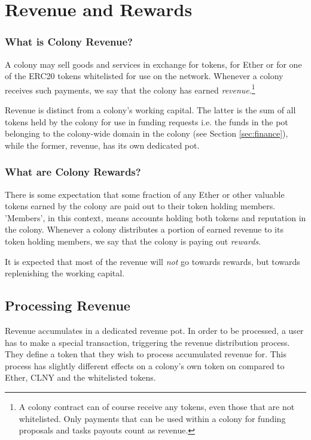 \section{Revenue and Rewards}\label{sec:revenue}

\subsubsection*{What is Colony Revenue?}
A colony may sell goods and services in exchange for tokens, for Ether or for one of the  ERC20 tokens whitelisted for use on the network. Whenever a colony receives such payments, we say that the colony has earned \emph{revenue}.\footnote{A colony contract can of course receive any tokens, even those that are not whitelisted. Only payments that can be used within a colony for funding proposals and tasks payouts count as revenue.}

Revenue is distinct from a colony's working capital. The latter is the sum of all tokens held by the colony for use in funding requests i.e. the funds in the pot belonging to the colony-wide domain in the colony (see Section \ref{sec:finance}), while the former, revenue, has its own dedicated pot.

\subsubsection*{What are Colony Rewards?}
There is some expectation that some fraction of any Ether or other valuable tokens earned by the colony are paid out to their token holding members. 'Members', in this context, means accounts holding both tokens and reputation in the colony. Whenever a colony distributes a portion of earned revenue to its token holding members, we say that the colony is paying out \emph{rewards}.

It is expected that most of the revenue will \emph{not} go towards rewards, but towards replenishing the working capital.

\subsection{Processing Revenue}
Revenue accumulates in a dedicated revenue pot. In order to be processed, a user has to make a special transaction, triggering the revenue distribution process. They define a token that they wish to process accumulated revenue for. This process has slightly different effects on a colony's own token on compared to Ether, CLNY and the whitelisted tokens.

